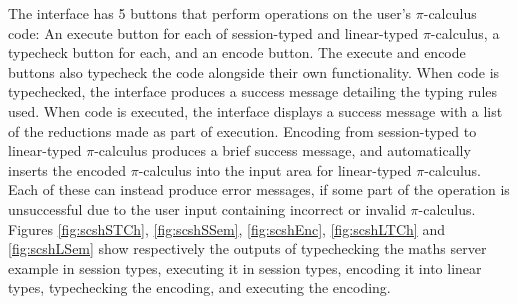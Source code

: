 \documentclass{l4proj}
\begin{document}
\quad The interface has 5 buttons that perform operations on the user's $\pi$-calculus code: An execute button for each of session-typed and linear-typed $\pi$-calculus, a typecheck button for each, and an encode button. The execute and encode buttons also typecheck the code alongside their own functionality. When code is typechecked, the interface produces a success message detailing the typing rules used. When code is executed, the interface displays a success message with a list of the reductions made as part of execution. Encoding from session-typed to linear-typed $\pi$-calculus produces a brief success message, and automatically inserts the encoded $\pi$-calculus into the input area for linear-typed $\pi$-calculus. Each of these can instead produce error messages, if some part of the operation is unsuccessful due to the user input containing incorrect or invalid $\pi$-calculus. Figures \ref{fig:scshSTCh}, \ref{fig:scshSSem}, \ref{fig:scshEnc}, \ref{fig:scshLTCh} and \ref{fig:scshLSem} show respectively the outputs of typechecking the maths server example in session types, executing it in session types, encoding it into linear types, typechecking the encoding, and executing the encoding.
\end{document}
